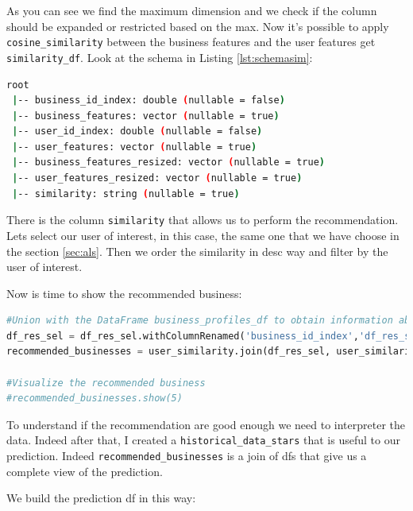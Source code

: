 \documentclass[12pt,english]{report}
\begin{document}
As you can see we find the maximum dimension and we check if the column should be expanded or restricted based on the max.
Now it's possible to apply \texttt{cosine\_similarity} between the business features and the user features get \texttt{similarity\_df}. Look at the schema in Listing \ref{lst:schemasim}:
\begin{lstlisting}[language={bash},label={lst:schemasim},caption={Similarity df schema}]
root
 |-- business_id_index: double (nullable = false)
 |-- business_features: vector (nullable = true)
 |-- user_id_index: double (nullable = false)
 |-- user_features: vector (nullable = true)
 |-- business_features_resized: vector (nullable = true)
 |-- user_features_resized: vector (nullable = true)
 |-- similarity: string (nullable = true)
\end{lstlisting}
There is the column \texttt{similarity} that allows us to perform the recommendation.
Lets select our user of interest, in this case, the same one that we have choose in the section \ref{sec:als}. Then we order the similarity in desc way and filter by the user of interest.\par
Now is time to show the recommended business:
\begin{lstlisting}[language={Python},label={lst:recommendedbusinesses},caption={Recommended businesses calculation}]
#Union with the DataFrame business_profiles_df to obtain information about recommended businesses
df_res_sel = df_res_sel.withColumnRenamed('business_id_index','df_res_sel_business_id_index')
recommended_businesses = user_similarity.join(df_res_sel, user_similarity.business_id_index == df_res_sel.df_res_sel_business_id_index, how='inner').drop('df_res_sel_business_id_index').select("business_id_index","name","business_features","user_id_index","user_features","business_features_resized","user_features_resized","similarity")

#Visualize the recommended business
#recommended_businesses.show(5)
\end{lstlisting}
To understand if the recommendation are good enough we need to interpreter the data. Indeed 
after that, I created a \texttt{historical\_data\_stars} that is useful to our prediction.
Indeed \texttt{recommended\_businesses} is a join of dfs that give us a complete view of the prediction.\par
We build the prediction df in this way: 
\end{document}
